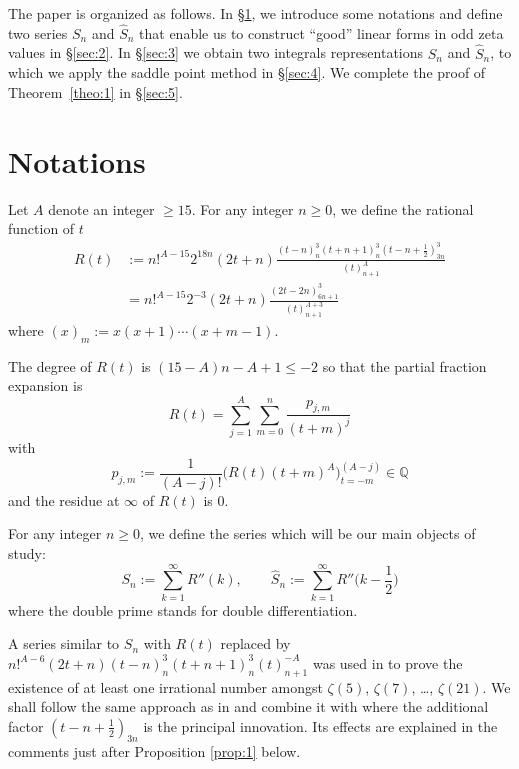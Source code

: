\documentclass[reqno,12pt]{article}
\theoremstyle{remark}
\begin{document}
The paper is organized as follows. In \S\ref{sec:1}, we introduce some notations and define two series $S_n$ and $\widehat{S}_n$ that enable us to construct ``good'' linear forms in odd zeta values in  \S\ref{sec:2}. In \S\ref{sec:3} we obtain two integrals representations $S_n$ and $\widehat{S}_n$, to which we apply the saddle point method in \S\ref{sec:4}. We complete the proof of Theorem~\ref{theo:1} in \S\ref{sec:5}. 



\section{Notations}\label{sec:1}


Let $A$ denote an integer $\ge 15$. For any integer $n\ge0$, we define the rational function of $t$
\begin{align*}
R(t)&:=n!^{A-15}2^{18n}(2t+n)\frac{(t-n)_n^3(t+n+1)_{n}^3(t-n+\frac12)_{3n}^3}{(t)_{n+1}^{A}} 
\\
&= n!^{A-15}2^{-3}(2t+n)\frac{(2t-2n)_{6n+1}^3}{(t)_{n+1}^{A+3}}
\end{align*}
where $(x)_m:=x(x+1)\cdots (x+m-1)$. 

The degree of $R(t)$ is $(15-A)n-A+1\le -2$ so that the partial fraction expansion is 
\begin{equation}\label{eq:5}
R(t)=\sum_{j=1}^A \sum_{m=0}^{n} \frac{p_{j,m}}{(t+m)^j}
\end{equation}
with
\begin{equation}\label{eq:pjm}
p_{j,m}:=\frac{1}{(A-j)!}\big(R(t)(t+m)^A\big)^{(A-j)}_{t=-m}\in  \mathbb Q
\end{equation}
and the residue at $\infty$ of $R(t)$ is $0$.

For any integer $n\ge 0$, we define the series which will be our main objects of study:
$$
S_n:=\sum_{k=1}^\infty R''(k), \qquad \widehat{S}_n:=\sum_{k=1}^\infty  R''\Big(k-\frac12\Big)
$$
where the double prime stands for double differentiation.

A series similar to $S_n$ with $R(t)$ replaced by $n!^{A-6}(2t+n)(t-n)_n^3(t+n+1)_{n}^3(t)_{n+1}^{-A}$ was used in \cite{ri2} to prove the existence of at least one irrational number amongst $\zeta(5)$, $\zeta(7)$, \ldots, $\zeta(21)$. We shall follow the same approach as in \cite{ri2}  and combine it with \cite{zud2} where the additional factor $(t-n+\frac12)_{3n}$ is the principal innovation. Its effects are explained in the comments just after Proposition \ref{prop:1} below.
\end{document}
